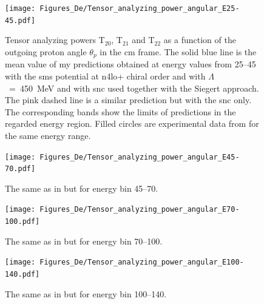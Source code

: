     \begin{figure}[h]
        \begin{center}
        \texttt{[image: Figures\_De/Tensor\_analyzing\_power\_angular\_E25-45.pdf]}
        \end{center}
        \caption{Tensor analyzing powers T$_{20}$, T$_{21}$ and T$_{22}$ as a function of the
        outgoing proton angle $\theta_p$ in the \gls{cm} frame.
        The solid blue line is the mean value of my predictions obtained 
        at energy values from \SIrange[range-phrase=\text{ to }]{25}{45}{\mev} with the
        \gls{sms} potential at \gls{n4lo+} chiral order and with $\Lambda$~=~450~MeV
         and with \gls{snc} used together with the Siegert approach. 
        The pink dashed line is a similar prediction but with the \gls{snc} only. 
        The corresponding bands show the limits of predictions in the regarded
        energy region.
        Filled circles are experimental data
        from \cite{rachek2007} for the same energy range.}
        \label{tensor_angular_25-45}
    \end{figure}

    \begin{figure}[h]
        \begin{center}
        \texttt{[image: Figures\_De/Tensor\_analyzing\_power\_angular\_E45-70.pdf]}
        \end{center}
        \caption{The same as in  but for energy bin \SIrange{45}{70}{\mev}.}
        \label{tensor_angular_45-70}
    \end{figure}

    \begin{figure}[h]
        \begin{center}
        \texttt{[image: Figures\_De/Tensor\_analyzing\_power\_angular\_E70-100.pdf]}
        \end{center}
        \caption{The same as in  but for energy bin \SIrange{70}{100}{\mev}.}
        \label{tensor_angular_70-100}
    \end{figure}        

    \begin{figure}[h]
        \begin{center}
        \texttt{[image: Figures\_De/Tensor\_analyzing\_power\_angular\_E100-140.pdf]}
        \end{center}
        \caption{The same as in  but for energy bin \SIrange{100}{140}{\mev}.}
        \label{tensor_angular_100-140}
    \end{figure}
        
